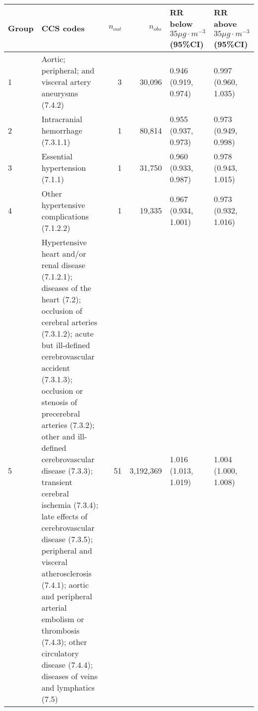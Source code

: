\begin{tabular}{lp{6.5cm}rrp{2.2cm}p{2.2cm}}
  \hline
Group & CCS codes & $n_{out}$ & $n_{obs}$ & RR below $35 \mu g \cdot m^{-3}$ (95\%CI) & RR above $35 \mu g \cdot m^{-3}$ (95\%CI) \\ 
  \hline
   1 & Aortic; peripheral; and visceral artery aneurysms (7.4.2) &    3 & 30,096 & 0.946 (0.919, 0.974) & 0.997 (0.960, 1.035) \\ 
     2 & Intracranial hemorrhage (7.3.1.1) &    1 & 80,814 & 0.955 (0.937, 0.973) & 0.973 (0.949, 0.998) \\ 
     3 & Essential hypertension (7.1.1) &    1 & 31,750 & 0.960 (0.933, 0.987) & 0.978 (0.943, 1.015) \\ 
     4 & Other hypertensive complications (7.1.2.2) &    1 & 19,335 & 0.967 (0.934, 1.001) & 0.973 (0.932, 1.016) \\ 
     5 & Hypertensive heart and/or renal disease (7.1.2.1); diseases of the heart (7.2); occlusion of cerebral arteries (7.3.1.2); acute but ill-defined cerebrovascular accident (7.3.1.3); occlusion or stenosis of precerebral arteries (7.3.2); other and ill-defined cerebrovascular disease (7.3.3); transient cerebral ischemia (7.3.4); late effects of cerebrovascular disease (7.3.5); peripheral and visceral atherosclerosis (7.4.1); aortic and peripheral arterial embolism or thrombosis (7.4.3); other circulatory disease (7.4.4); diseases of veins and lymphatics (7.5) &   51 & 3,192,369 & 1.016 (1.013, 1.019) & 1.004 (1.000, 1.008) \\ 
   \hline
\end{tabular}


